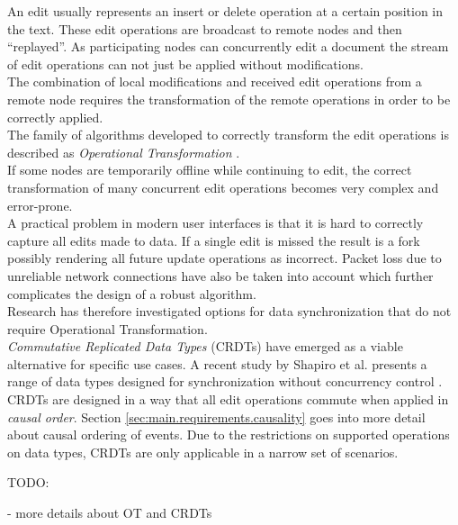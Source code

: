 An edit usually represents an insert or delete operation at a certain position in the text.
These edit operations are broadcast to remote nodes and then ``replayed''.
As participating nodes can concurrently edit a document the stream of edit operations can not just be applied without modifications.\\
The combination of local modifications and received edit operations from a remote node requires the transformation of the remote operations in order to be correctly applied.\\
The family of algorithms developed to correctly transform the edit operations is described as \emph{Operational Transformation} \cite{Ellis:1998vf}.\\
If some nodes are temporarily offline while continuing to edit, the correct transformation of many concurrent edit operations becomes very complex and error-prone.\\
A practical problem in modern user interfaces is that it is hard to correctly capture all edits made to data.
If a single edit is missed the result is a fork possibly rendering all future update operations as incorrect.
Packet loss due to unreliable network connections have also be taken into account which further complicates the design of a robust algorithm.\\
Research has therefore investigated options for data synchronization that do not require Operational Transformation.\\

\emph{Commutative Replicated Data Types} (CRDTs) have emerged as a viable alternative for specific use cases.
A recent study by Shapiro et al. presents a range of data types designed for synchronization without concurrency control \cite{Shapiro:2011wy}.\\
CRDTs are designed in a way that all edit operations commute when applied in \emph{causal order}.
Section \ref{sec:main.requirements.causality} goes into more detail about causal ordering of events.
Due to the restrictions on supported operations on data types, CRDTs are only applicable in a narrow set of scenarios.

TODO:

- more details about OT and CRDTs

